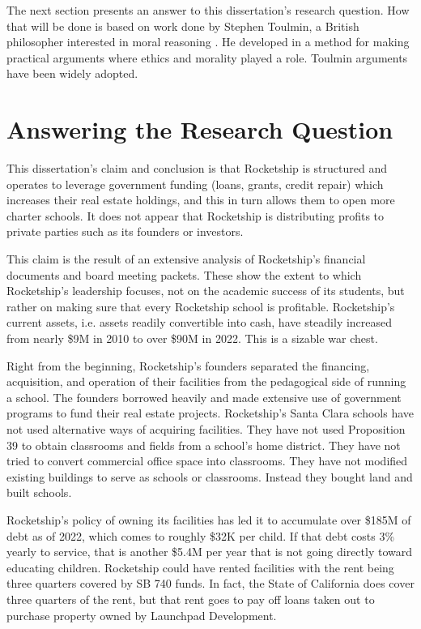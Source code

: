 The next section presents an answer to this dissertation's research question. How that will be done is based on work done by Stephen Toulmin, a British philosopher interested in moral reasoning \parencite{Toulmin2003}. He developed in  a method for making practical arguments where ethics and morality played a role. Toulmin arguments have been widely adopted. %

\section{Answering the Research Question}\label{sec:answ-rese-quest}\indent

This dissertation's claim and conclusion is that Rocketship is structured and operates to leverage government funding (loans, grants, credit repair) which increases their real estate holdings, and this in turn allows them to open more charter schools. It does not appear that Rocketship is distributing profits to private parties such as its founders or investors.\label{p:claim}

This claim is the result of an extensive analysis of Rocketship's financial documents and board meeting packets. These show the extent to which Rocketship's leadership focuses, not on the academic success of its students, but rather on making sure that every Rocketship school is profitable. Rocketship's current assets, i.e. assets readily convertible into cash, have steadily increased from nearly \$9M in 2010 to over \$90M in 2022. This is a sizable war chest.

Right from the beginning, Rocketship's founders separated the financing, acquisition, and operation of their facilities from the pedagogical side of running a school. The founders borrowed heavily and made extensive use of government programs to fund their real estate projects. Rocketship's Santa Clara schools have not used alternative ways of acquiring facilities. They have not used Proposition 39 to obtain classrooms and fields from a school's home district. They have not tried to convert commercial office space into classrooms. They have not modified existing buildings to serve as schools or classrooms. Instead they bought land and built schools.

Rocketship’s policy of owning its facilities has led it to accumulate over \$185M of debt as of 2022, which comes to roughly \$32K per child. If that debt costs 3\% yearly to service, that is another \$5.4M per year that is not going directly toward educating children. Rocketship could have rented facilities with the rent being three quarters covered by SB 740 funds. In fact, the State of California does cover three quarters of the rent, but that rent goes to pay off loans taken out to purchase property owned by Launchpad Development. 

